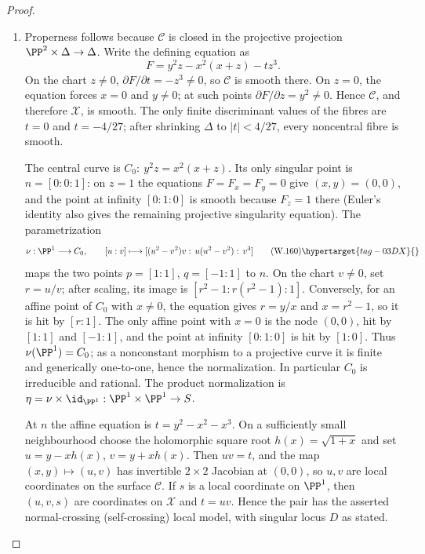 \begin{proof}
\begin{enumerate}[label={$\langle1\rangle$\arabic*.},leftmargin=*]
\item 
Properness follows because $\mathcal C$ is closed in the projective
projection $\PP^2\times\Delta\to\Delta$.  Write the defining equation as
\[
 F=y^2z-x^2(x+z)-tz^3.
\]
On the chart $z\ne0$, $\partial F/\partial t=-z^3\ne0$, so $\mathcal C$
is smooth there.  On $z=0$, the equation forces $x=0$ and $y\ne0$; at such
points $\partial F/\partial z=y^2\ne0$.  Hence $\mathcal C$, and therefore
$\mathcal X$, is smooth.  The only finite discriminant values of the fibres
are $t=0$ and $t=-4/27$; after shrinking $\Delta$ to $|t|<4/27$, every
noncentral fibre is smooth.

The central curve is
\(C_0:\ y^2z=x^2(x+z)\).  Its only singular point is
\(n=[0:0:1]\): on $z=1$ the equations $F=F_x=F_y=0$ give $(x,y)=(0,0)$,
and the point at infinity $[0:1:0]$ is smooth because $F_z=1$ there
(Euler's identity also gives the remaining projective singularity equation).
The parametrization
\[
 \nu:\PP^1\longrightarrow C_0,\qquad
 [u:v]\longmapsto
 [(u^2-v^2)v:\,u(u^2-v^2):\,v^3]
 \tag{W.160}\hypertarget{tag-03DX}{}\label{wbII:eq:CN:4.3}
\]
maps the two points $p=[1:1]$, $q=[-1:1]$ to $n$.  On the chart $v\ne0$, set
$r=u/v$; after scaling, its image is
$[r^2-1:r(r^2-1):1]$.  Conversely, for an affine point of $C_0$ with
$x\ne0$, the equation gives $r=y/x$ and $x=r^2-1$, so it is hit by
$[r:1]$.  The only affine point with $x=0$ is the node $(0,0)$, hit by
$[1:1]$ and $[-1:1]$, and the point at infinity $[0:1:0]$ is hit by
$[1:0]$.  Thus $\nu(\PP^1)=C_0$; as a nonconstant morphism to a projective
curve it is finite and generically one-to-one, hence the normalization.  In
particular $C_0$ is irreducible and rational.  The product normalization
is $\eta=\nu\times\id_{\PP^1}:\PP^1\times\PP^1\to S$.

At $n$ the affine equation is
\(t=y^2-x^2-x^3\).  On a sufficiently small neighbourhood choose the
holomorphic square root $h(x)=\sqrt{1+x}$ and set
\(u=y-xh(x)\), \(v=y+xh(x)\).  Then $uv=t$, and the map
$(x,y)\mapsto(u,v)$ has invertible $2\times2$ Jacobian at $(0,0)$, so $u,v$
are local coordinates on the surface $\mathcal C$.  If $s$ is a local
coordinate on $\PP^1$, then $(u,v,s)$ are coordinates on $\mathcal X$ and
$t=uv$.  Hence the pair has the asserted normal-crossing (self-crossing)
local model, with singular locus $D$ as stated.

\end{enumerate}
\end{proof}
